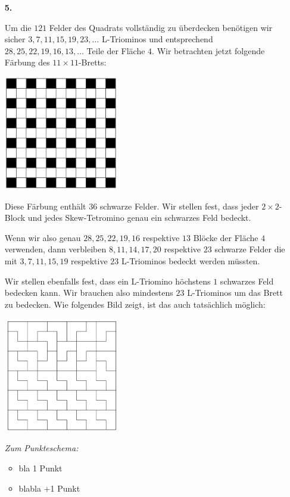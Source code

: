 \documentclass[12pt,a4paper]{article}
\theoremstyle{plain}
\theoremstyle{definition}
\theoremstyle{remark}
\begin{document}
\begin{enumerate}

\item[\textbf{5.}]


Um die $121$ Felder des Quadrats vollständig zu überdecken benötigen wir sicher $3,7,11,15,19, 23,\ldots $ L-Triominos und entsprechend $28,25,22,19,16,13,\ldots$ Teile der Fläche $4$.
Wir betrachten jetzt folgende Färbung des $11\times 11$-Bretts:

\begin{center}
  \includegraphics[width=5cm]{./aufgabe5-faerb.png}
\end{center}

Diese Färbung enthält $36$ schwarze Felder.
Wir stellen fest, dass jeder $2\times 2$-Block und jedes Skew-Tetromino genau ein  schwarzes Feld bedeckt. 

Wenn wir also genau $28,25,22,19,16$ respektive $13$ Blöcke der Fläche $4$ verwenden, dann verbleiben $8,11,14,17,20$ respektive $23$ schwarze Felder die mit $3,7,11,15,19$ respektive $23$ L-Triominos bedeckt werden müssten.

Wir stellen ebenfalls fest, dass ein L-Triomino höchstens $1$ schwarzes Feld bedecken kann. Wir brauchen also mindestens $23$ L-Triominos um das Brett zu bedecken.
Wie folgendes Bild zeigt, ist das auch tatsächlich möglich:

\begin{center}
  \includegraphics[width=5cm]{./aufgabe5-23.png}
\end{center}


\emph{Zum Punkteschema:} 
\begin{itemize}
  \item bla 1 Punkt
  \item blabla +1 Punkt
\end{itemize}
          



\end{enumerate}
\end{document}
